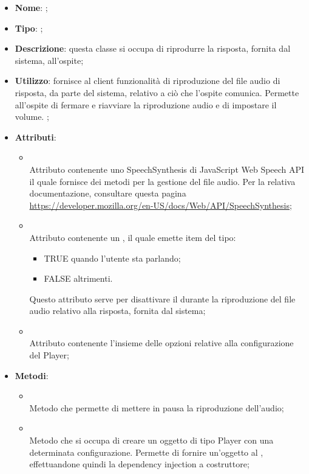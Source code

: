 \begin{itemize}
	\item \textbf{Nome}: ;
	\item \textbf{Tipo}: ;
	\item \textbf{Descrizione}: questa classe si occupa di riprodurre la risposta, fornita dal sistema, all'ospite;
	\item \textbf{Utilizzo}: fornisce al client funzionalità di riproduzione del file audio di risposta, da parte del sistema, relativo a ciò che l'ospite comunica.
Permette all'ospite di fermare e riavviare la riproduzione audio e di impostare il volume.
;
	\item \textbf{Attributi}:
	\begin{itemize}
		\item[]  \\
		Attributo contenente uno SpeechSynthesis di JavaScript Web Speech API il quale fornisce dei metodi per la gestione del file audio.
Per la relativa documentazione, consultare questa pagina \url{https://developer.mozilla.org/en-US/docs/Web/API/SpeechSynthesis};
		\item[]  \\
		Attributo contenente un , il quale emette item del tipo:
\begin{itemize}
\item TRUE quando l'utente sta parlando;
\item FALSE altrimenti.
\end{itemize}
Questo attributo serve per disattivare il  durante la riproduzione del file audio relativo alla risposta, fornita dal sistema;
		\item[]  \\
		Attributo contenente l'insieme delle opzioni relative alla configurazione del Player;
	\end{itemize}
	\item \textbf{Metodi}:
	\begin{itemize}
		\item[]  \\
		Metodo che permette di mettere in pausa la riproduzione dell'audio;\\
		\item[]  \\
		Metodo che si occupa di creare un oggetto di tipo Player con una determinata configurazione. Permette di fornire un'oggetto  al , effettuandone quindi la dependency injection a costruttore;\\

\end{itemize}
\end{itemize}
